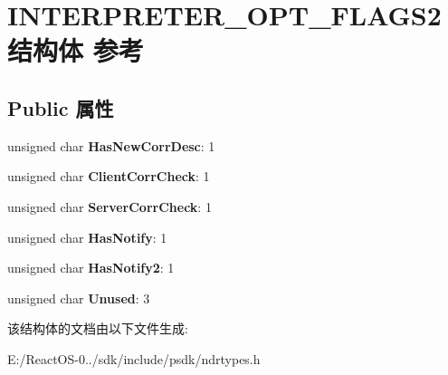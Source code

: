 \hypertarget{struct_i_n_t_e_r_p_r_e_t_e_r___o_p_t___f_l_a_g_s2}{}\section{I\+N\+T\+E\+R\+P\+R\+E\+T\+E\+R\+\_\+\+O\+P\+T\+\_\+\+F\+L\+A\+G\+S2结构体 参考}
\label{struct_i_n_t_e_r_p_r_e_t_e_r___o_p_t___f_l_a_g_s2}
\subsection*{Public 属性}
\begin{DoxyCompactItemize}
\item 
\mbox{\label{struct_i_n_t_e_r_p_r_e_t_e_r___o_p_t___f_l_a_g_s2_a35fbe63b8ecc3a8c9308a6b1cc86a457}} 
unsigned char {\bfseries Has\+New\+Corr\+Desc}\+: 1
\item 
\mbox{\label{struct_i_n_t_e_r_p_r_e_t_e_r___o_p_t___f_l_a_g_s2_a00985c2403db4613e29b71250ef7a6dd}} 
unsigned char {\bfseries Client\+Corr\+Check}\+: 1
\item 
\mbox{\label{struct_i_n_t_e_r_p_r_e_t_e_r___o_p_t___f_l_a_g_s2_af255b6b78677e76bbcf88d77b7ba4191}} 
unsigned char {\bfseries Server\+Corr\+Check}\+: 1
\item 
\mbox{\label{struct_i_n_t_e_r_p_r_e_t_e_r___o_p_t___f_l_a_g_s2_a07fe98f5b29bea2cc6c9f3361447abfb}} 
unsigned char {\bfseries Has\+Notify}\+: 1
\item 
\mbox{\label{struct_i_n_t_e_r_p_r_e_t_e_r___o_p_t___f_l_a_g_s2_af368044eea14d087594859d559651cee}} 
unsigned char {\bfseries Has\+Notify2}\+: 1
\item 
\mbox{\label{struct_i_n_t_e_r_p_r_e_t_e_r___o_p_t___f_l_a_g_s2_a85ace07908406c6306d3c5e101bc1790}} 
unsigned char {\bfseries Unused}\+: 3
\end{DoxyCompactItemize}


该结构体的文档由以下文件生成\+:\begin{DoxyCompactItemize}
\item 
E\+:/\+React\+O\+S-\/0../sdk/include/psdk/ndrtypes.\+h\end{DoxyCompactItemize}
